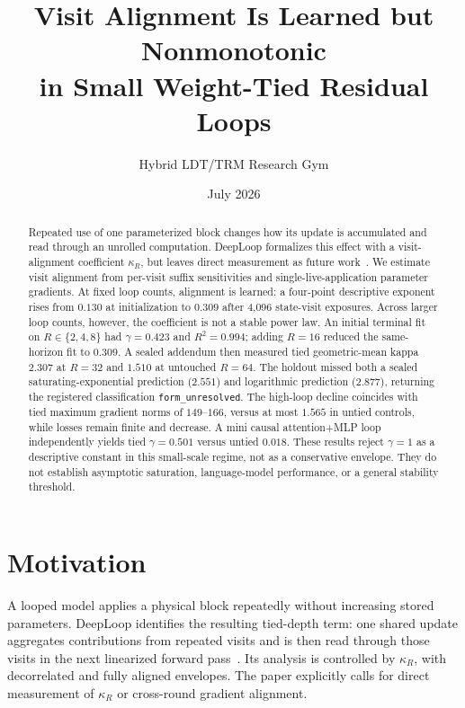\documentclass[10pt]{article}
\title{Visit Alignment Is Learned but Nonmonotonic\\
in Small Weight-Tied Residual Loops}
\author{Hybrid LDT/TRM Research Gym}
\date{July 2026}
\begin{document}
\maketitle

\begin{abstract}
Repeated use of one parameterized block changes how its update is accumulated
and read through an unrolled computation. DeepLoop formalizes this effect with
a visit-alignment coefficient $\kappa_R$, but leaves direct measurement as
future work~\cite{li2026deeploop}. We estimate visit alignment from per-visit
suffix sensitivities and single-live-application parameter gradients. At fixed
loop counts, alignment is learned: a four-point descriptive exponent rises
from $0.130$ at initialization to $0.309$ after 4,096 state-visit exposures.
Across larger loop counts, however, the coefficient is not a stable power law.
An initial terminal fit on $R\in\{2,4,8\}$ had $\gamma=0.423$ and
$R^2=0.994$; adding $R=16$ reduced the same-horizon fit to $0.309$. A sealed
addendum then measured tied geometric-mean kappa $2.307$ at $R=32$ and $1.510$
at untouched $R=64$. The holdout missed both a sealed saturating-exponential
prediction ($2.551$) and logarithmic prediction ($2.877$), returning the
registered classification \texttt{form\_unresolved}. The high-loop decline
coincides with tied maximum gradient norms of $149$--$166$, versus at most
$1.565$ in untied controls, while losses remain finite and decrease. A mini
causal attention+MLP loop independently yields tied $\gamma=0.501$ versus
untied $0.018$. These results reject $\gamma=1$ as a descriptive constant in
this small-scale regime, not as a conservative envelope. They do not establish
asymptotic saturation, language-model performance, or a general stability
threshold.
\end{abstract}

\section{Motivation}

A looped model applies a physical block repeatedly without increasing stored
parameters. DeepLoop identifies the resulting tied-depth term: one shared
update aggregates contributions from repeated visits and is then read through
those visits in the next linearized forward pass~\cite{li2026deeploop}. Its
analysis is controlled by $\kappa_R$, with decorrelated and fully aligned
envelopes. The paper explicitly calls for direct measurement of $\kappa_R$ or
cross-round gradient alignment.
\end{document}
